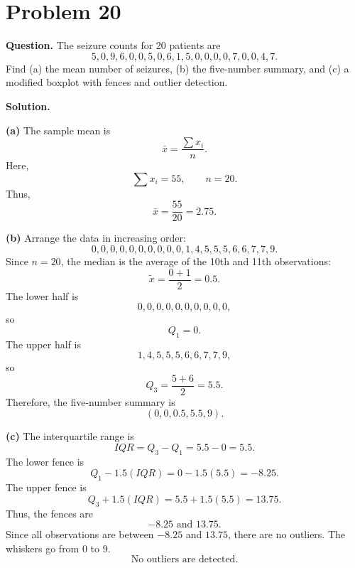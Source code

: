 \documentclass[11pt]{article}
\begin{document}
\newpage
\section*{Problem 20}

\textbf{Question.} The seizure counts for 20 patients are
\[
5,0,9,6,0,0,5,0,6,1,5,0,0,0,0,7,0,0,4,7.
\]
Find (a) the mean number of seizures, (b) the five-number summary, and (c) a modified boxplot with fences and outlier detection.

\textbf{Solution.}

\textbf{(a)} The sample mean is
\[
\bar x=\frac{\sum x_i}{n}.
\]
Here,
\[
\sum x_i=55, \qquad n=20.
\]
Thus,
\[
\boxed{\bar x=\frac{55}{20}=2.75}.
\]

\textbf{(b)} Arrange the data in increasing order:
\[
0,0,0,0,0,0,0,0,0,0,1,4,5,5,5,6,6,7,7,9.
\]
Since $n=20$, the median is the average of the 10th and 11th observations:
\[
\tilde x=\frac{0+1}{2}=0.5.
\]
The lower half is
\[
0,0,0,0,0,0,0,0,0,0,
\]
so
\[
Q_1=0.
\]
The upper half is
\[
1,4,5,5,5,6,6,7,7,9,
\]
so
\[
Q_3=\frac{5+6}{2}=5.5.
\]
Therefore, the five-number summary is
\[
\boxed{(0,0,0.5,5.5,9)}.
\]

\textbf{(c)} The interquartile range is
\[
IQR=Q_3-Q_1=5.5-0=5.5.
\]
The lower fence is
\[
Q_1-1.5(IQR)=0-1.5(5.5)=-8.25.
\]
The upper fence is
\[
Q_3+1.5(IQR)=5.5+1.5(5.5)=13.75.
\]
Thus, the fences are
\[
\boxed{-8.25\text{ and }13.75}.
\]
Since all observations are between $-8.25$ and $13.75$, there are no outliers. The whiskers go from $0$ to $9$.
\[
\boxed{\text{No outliers are detected.}}
\]

\begin{center}
\end{center}
\end{document}
